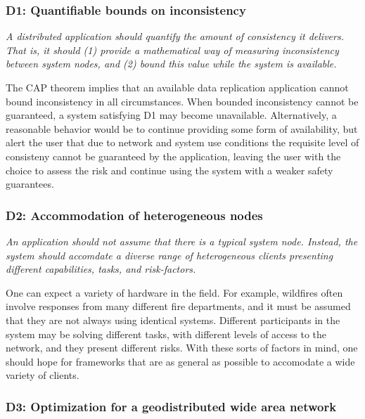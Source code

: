 \documentclass[]             %
{NASA}                       %
\theoremstyle{definition}
\begin{document}
\hypertarget{d1-quantifiable-bounds-on-inconsistency}{%
  \subsubsection{D1: Quantifiable bounds on
    inconsistency}\label{d1-quantifiable-bounds-on-inconsistency}}

\emph{A distributed application should quantify the amount of
consistency it delivers. That is, it should (1) provide a mathematical
way of measuring inconsistency between system nodes, and (2) bound
this value while the system is available.}

The CAP theorem implies that an available data replication application
cannot bound inconsistency in all circumstances. When bounded
inconsistency cannot be guaranteed, a system satisfying D1 may become
unavailable. Alternatively, a reasonable behavior would be to continue
providing some form of availability, but alert the user that due to
network and system use conditions the requisite level of consisteny
cannot be guaranteed by the application, leaving the user with the
choice to assess the risk and continue using the system with a weaker
safety guarantees.

\hypertarget{d2-accommodation-of-heterogeneous-nodes}{%
  \subsubsection{D2: Accommodation of heterogeneous
    nodes}\label{d2-accommodation-of-heterogeneous-nodes}}

\emph{An application should not assume that there is a typical system
node. Instead, the system should accomdate a diverse range of
heterogeneous clients presenting different capabilities, tasks, and
risk-factors.}

One can expect a variety of hardware in the field. For example,
wildfires often involve responses from many different fire departments,
and it must be assumed that they are not always using identical systems.
Different participants in the system may be solving different tasks,
with different levels of access to the network, and they present
different risks. With these sorts of factors in mind, one should hope
for frameworks that are as general as possible to accomodate a wide
variety of clients.

\hypertarget{d3-optimization-for-a-geodistributed-wide-area-network}{%
  \subsubsection{D3: Optimization for a geodistributed wide area
    network}\label{d3-optimization-for-a-geodistributed-wide-area-network}}
\end{document}
